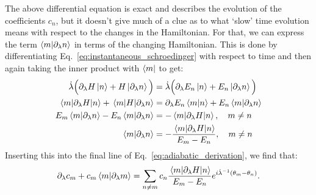 \documentclass[a4paper,oneside,11pt]{book}
\newcommand{\dlambda}{\partial_{\lambda}}
\newcommand{\dotlambda}{\dot{\lambda}}
\begin{document}
    The above differential equation is exact and describes the evolution of the coefficients $c_n$,  but it doesn't give much of a clue as to what `slow' time evolution means with respect to the changes in the Hamiltonian. For that, we can express the term $\braket{m}{\dlambda n}$ in terms of the changing Hamiltonian. This is done by differentiating Eq.~\eqref{eq:instantaneous_schroedinger} with respect to time and then again taking the inner product with $\bra{m}$ to get:
    \begin{equation}\label{eq:hamiltonian_derivative}
        \begin{aligned}
            \dotlambda \Big(\dlambda{H}\ket{n} + H \ket{\dlambda n}\Big)  &= \dotlambda \Big(\dlambda{E_n}\ket{n} + E_n \ket{\dlambda n}\Big) \\
            \mel{m}{\dlambda H}{n} + \mel{m}{H}{\dlambda n} &= \dlambda E_n\braket{m}{n} + E_n \braket{m}{\dlambda n} \\
            E_m \braket{m}{\dlambda n} - E_n \braket{m}{\dlambda n} &= - \mel{m}{\dlambda H}{n}, \quad m \neq n \\
            \braket{m}{\dlambda n} &= - \frac{\mel{m}{\dlambda H}{n}}{E_m - E_n}, \quad m \neq n
        \end{aligned}
    \end{equation}
    Inserting this into the final line of Eq.~\eqref{eq:adiabatic_derivation}, we find that:
    \begin{equation}\label{eq:coefficient_exact}
            \dlambda c_m + c_m \braket{m}{\dlambda m} = \sum_{n \neq m} c_n  \frac{\mel{m}{\dlambda H}{n}}{E_m - E_n}e^{i \dotlambda^{-1} (\theta_m-\theta_n)}.
    \end{equation}
\end{document}
